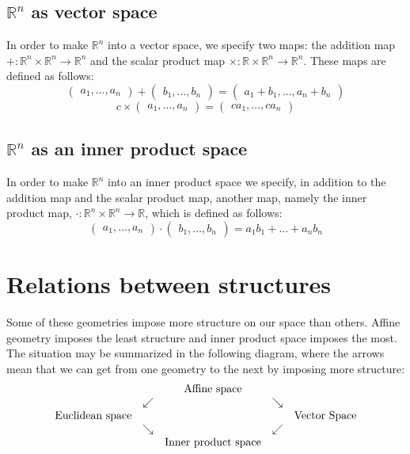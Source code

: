 \documentclass[12pt]{article}
\begin{document}
\subsection{$\mathbb{R}^n$ as vector space}

In order to make $\mathbb{R}^n$ into a vector space, we specify two maps: the addition map $+ \colon \mathbb{R}^n \times \mathbb{R}^n \to \mathbb{R}^n$ and the scalar product map $\times \colon \mathbb{R} \times \mathbb{R}^n \to \mathbb{R}^n$.  These maps are defined as follows:
 $$\begin{pmatrix} a_1, \ldots,  a_n \end{pmatrix} + \begin{pmatrix} b_1, \ldots, b_n \end{pmatrix} = 
\begin{pmatrix} a_1 + b_1, \ldots, a_n + b_n \end{pmatrix}$$
 $$c \times \begin{pmatrix} a_1, \ldots, a_n \end{pmatrix}
 = \begin{pmatrix} c a_1, \ldots, c a_n \end{pmatrix}$$

\subsection{$\mathbb{R}^n$ as an inner product space}

In order to make $\mathbb{R}^n$ into an inner product space we specify, in addition to the addition map and the scalar product map, another map, namely the inner product map, $\cdot \colon \mathbb{R}^n \times \mathbb{R}^n \to \mathbb{R}$, which is defined as follows:
 $$\begin{pmatrix} a_1, \ldots, a_n \end{pmatrix} \cdot
 \begin{pmatrix} b_1, \ldots, b_n \end{pmatrix} = 
a_1 b_1 + \ldots + a_n b_n$$

\section{Relations between structures}

Some of these geometries impose more structure on our space than others.  Affine geometry imposes the least structure and inner product space imposes the most.  The situation may be summarized in the following diagram, where the arrows mean that we can get from one geometry to the next by imposing more structure:
  $$\begin{matrix} & & \hbox{Affine space} & & \\
& \swarrow & & \searrow & \\
\hbox{Euclidean space} & & & & \hbox{Vector Space} \\
& \searrow & & \swarrow & \\
& & \hbox{Inner product space} & & \\ \end{matrix}$$
\end{document}
